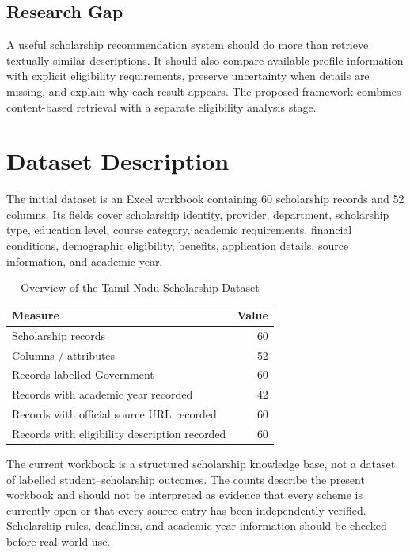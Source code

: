 \documentclass[conference]{IEEEtran}
\begin{document}
\subsection{Research Gap}
A useful scholarship recommendation system should do more than retrieve textually similar descriptions. It should also compare available profile information with explicit eligibility requirements, preserve uncertainty when details are missing, and explain why each result appears. The proposed framework combines content-based retrieval with a separate eligibility analysis stage.

\section{Dataset Description}
The initial dataset is an Excel workbook containing 60 scholarship records and 52 columns. Its fields cover scholarship identity, provider, department, scholarship type, education level, course category, academic requirements, financial conditions, demographic eligibility, benefits, application details, source information, and academic year.

\begin{table}[!t]
\caption{Overview of the Tamil Nadu Scholarship Dataset}
\label{tab:overview}
\centering
\small
\begin{tabular}{p{}r}
\toprule
\textbf{Measure} & \textbf{Value}\\
\midrule
Scholarship records & 60\\
Columns / attributes & 52\\
Records labelled Government & 60\\
Records with academic year recorded & 42\\
Records with official source URL recorded & 60\\
Records with eligibility description recorded & 60\\
\bottomrule
\end{tabular}
\end{table}

The current workbook is a structured scholarship knowledge base, not a dataset of labelled student--scholarship outcomes. The counts describe the present workbook and should not be interpreted as evidence that every scheme is currently open or that every source entry has been independently verified. Scholarship rules, deadlines, and academic-year information should be checked before real-world use.
\end{document}
